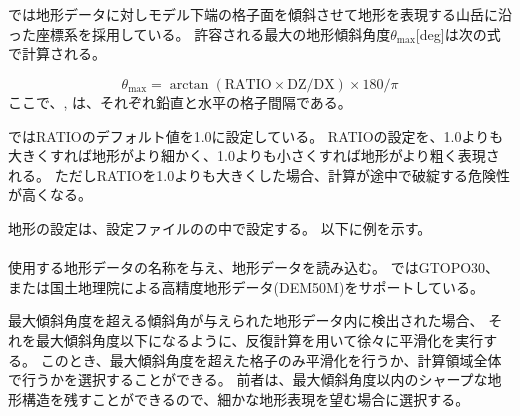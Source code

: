 \section{\SecBasicTopoSetting} \label{subsec:basic_usel_topo}

\scalerm では地形データに対しモデル下端の格子面を傾斜させて地形を表現する山岳に沿った座標系を採用している。
許容される最大の地形傾斜角度$\theta_{\max}$[deg]は次の式で計算される。

\[ \theta_{\max} = \arctan( \mathrm{RATIO} \times \mathrm{DZ}/\mathrm{DX} ) \times 180/\pi \]
ここで、,  は、それぞれ鉛直と水平の格子間隔である。

\scalerm ではRATIOのデフォルト値を1.0に設定している。
RATIOの設定を、1.0よりも大きくすれば地形がより細かく、1.0よりも小さくすれば地形がより粗く表現される。
ただしRATIOを1.0よりも大きくした場合、計算が途中で破綻する危険性が高くなる。

地形の設定は、設定ファイルのの中で設定する。
以下に例を示す。\\

\\


使用する地形データの名称を与え、地形データを読み込む。
\scalerm ではGTOPO30、または国土地理院による高精度地形データ(DEM50M)をサポートしている。

最大傾斜角度を超える傾斜角が与えられた地形データ内に検出された場合、
それを最大傾斜角度以下になるように、反復計算を用いて徐々に平滑化を実行する。
このとき、最大傾斜角度を超えた格子のみ平滑化を行うか、計算領域全体で行うかを選択することができる。
前者は、最大傾斜角度以内のシャープな地形構造を残すことができるので、細かな地形表現を望む場合に選択する。

